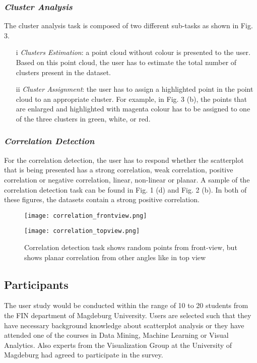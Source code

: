 \documentclass[journal]{vgtc}                %
\begin{document}
\subsubsection{\textit{Cluster Analysis}}
The cluster analysis task is composed of two different sub-tasks as shown in Fig. 3.
\begin{enumerate}
    \item[i] \textit{Clusters Estimation}: a point cloud without colour is presented to the user. Based on this point cloud, the user has to estimate the total number of clusters present in the dataset. 
    \item[ii] \textit{Cluster Assignment}: the user has to assign a highlighted point in the point cloud to an appropriate cluster. For example, in Fig. 3 (b), the points that are enlarged and highlighted with magenta colour has to be assigned to one of the three clusters in green, white, or red. 
\end{enumerate}

\subsubsection{\textit{Correlation Detection}}
For the correlation detection, the user has to respond whether the scatterplot that is being presented has a strong correlation, weak correlation, positive correlation or negative correlation, linear, non-linear or planar. A sample of the correlation detection task can be found in Fig. 1 (d) and Fig. 2 (b). In both of these figures, the datasets contain a strong positive correlation.

\begin{figure}[ht]
    \begin{minipage}[b]{0.45\linewidth}
        \centering
        \texttt{[image: correlation\_frontview.png]}
    \end{minipage}
    \hspace{0.5cm}
    \begin{minipage}[b]{0.45\linewidth}
        \centering
        \texttt{[image: correlation\_topview.png]}
    \end{minipage}
    \caption{Correlation detection task shows random points from front-view, but shows planar correlation from other angles like in top view}
\end{figure}

\subsection{Participants}
The user study would be conducted within the range of 10 to 20 students from the FIN department of Magdeburg University. Users are selected such that they have necessary background knowledge about scatterplot analysis or they have attended one of the courses in Data Mining, Machine Learning or Visual Analytics. Also experts from the Visualization Group at the University of Magdeburg had agreed to participate in the survey.
\end{document}
